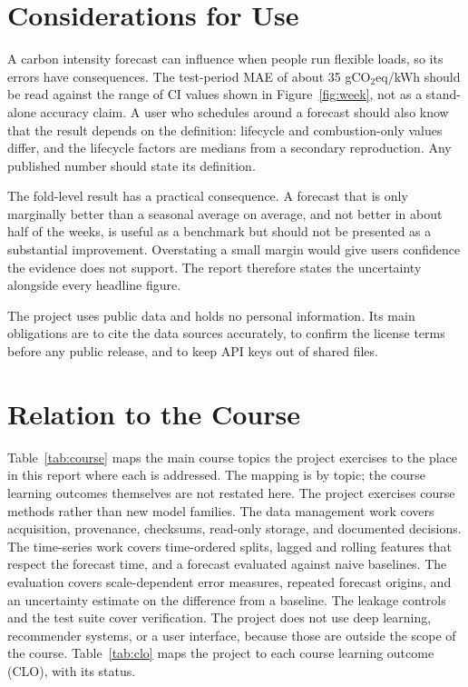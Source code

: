 \documentclass[10pt,journal,compsoc]{IEEEtran}
\begin{document}
\section{Considerations for Use}
\label{sec:considerations}
A carbon intensity forecast can influence when people run flexible loads, so its errors have consequences. The test-period MAE of about 35 gCO$_2$eq/kWh should be read against the range of CI values shown in Figure~\ref{fig:week}, not as a stand-alone accuracy claim. A user who schedules around a forecast should also know that the result depends on the definition: lifecycle and combustion-only values differ, and the lifecycle factors are medians from a secondary reproduction. Any published number should state its definition.

The fold-level result has a practical consequence. A forecast that is only marginally better than a seasonal average on average, and not better in about half of the weeks, is useful as a benchmark but should not be presented as a substantial improvement. Overstating a small margin would give users confidence the evidence does not support. The report therefore states the uncertainty alongside every headline figure.

The project uses public data and holds no personal information. Its main obligations are to cite the data sources accurately, to confirm the license terms before any public release, and to keep API keys out of shared files.

\section{Relation to the Course}
\label{sec:course}

Table~\ref{tab:course} maps the main course topics the project exercises to the place in this report where each is addressed. The mapping is by topic; the course learning outcomes themselves are not restated here. The project exercises course methods rather than new model families. The data management work covers acquisition, provenance, checksums, read-only storage, and documented decisions. The time-series work covers time-ordered splits, lagged and rolling features that respect the forecast time, and a forecast evaluated against naive baselines. The evaluation covers scale-dependent error measures, repeated forecast origins, and an uncertainty estimate on the difference from a baseline. The leakage controls and the test suite cover verification. The project does not use deep learning, recommender systems, or a user interface, because those are outside the scope of the course. Table~\ref{tab:clo} maps the project to each course learning outcome (CLO), with its status.
\end{document}
